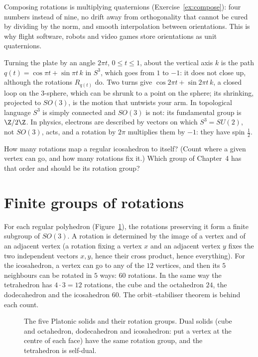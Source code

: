 Composing rotations is multiplying quaternions (Exercise~\ref{ex:compose}): four numbers instead of nine, no drift away from orthogonality that cannot be cured by dividing by the norm, and smooth interpolation between orientations. This is why flight software, robots and video games store orientations as unit quaternions.

\begin{remark}
Turning the plate by an angle $2\pi t$, $0\le t\le1$, about the vertical axis $k$ is the path $q(t)=\cos\pi t+\sin\pi t\,k$ in $S^3$, which goes from $1$ to $-1$: it does not close up, although the rotations $R_{q(t)}$ do. Two turns give $\cos2\pi t+\sin2\pi t\,k$, a closed loop on the $3$-sphere, which can be shrunk to a point on the sphere; its shrinking, projected to $SO(3)$, is the motion that untwists your arm. In topological language $S^3$ is simply connected and $SO(3)$ is not: its fundamental group is $\Z/2\Z$. In physics, electrons are described by vectors on which $S^3=SU(2)$, not $SO(3)$, acts, and a rotation by $2\pi$ multiplies them by $-1$: they have spin $\frac12$.
\end{remark}

\begin{think}
How many rotations map a regular icosahedron to itself? (Count where a given vertex can go, and how many rotations fix it.) Which group of Chapter~4 has that order and should be its rotation group?
\end{think}

\section{Finite groups of rotations}

For each regular polyhedron (Figure~\ref{fig:solids}), the rotations preserving it form a finite subgroup of $SO(3)$. A rotation is determined by the image of a vertex and of an adjacent vertex (a rotation fixing a vertex $x$ and an adjacent vertex $y$ fixes the two independent vectors $x,y$, hence their cross product, hence everything). For the icosahedron, a vertex can go to any of the $12$ vertices, and then its $5$ neighbours can be rotated in $5$ ways: $60$ rotations. In the same way the tetrahedron has $4\cdot3=12$ rotations, the cube and the octahedron $24$, the dodecahedron and the icosahedron $60$. The orbit--stabiliser theorem is behind each count.

\begin{figure}[ht]
\centering
{}
\caption{The five Platonic solids and their rotation groups. Dual solids (cube and octahedron, dodecahedron and icosahedron: put a vertex at the centre of each face) have the same rotation group, and the tetrahedron is self-dual.}
\label{fig:solids}
\end{figure}

